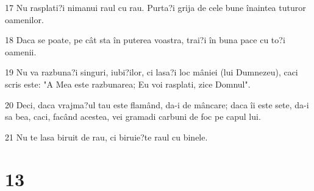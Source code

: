 \par 17 Nu rasplati?i nimanui raul cu rau. Purta?i grija de cele bune înaintea tuturor oamenilor.
\par 18 Daca se poate, pe cât sta în puterea voastra, trai?i în buna pace cu to?i oamenii.
\par 19 Nu va razbuna?i singuri, iubi?ilor, ci lasa?i loc mâniei (lui Dumnezeu), caci scris este: "A Mea este razbunarea; Eu voi rasplati, zice Domnul".
\par 20 Deci, daca vrajma?ul tau este flamând, da-i de mâncare; daca îi este sete, da-i sa bea, caci, facând acestea, vei gramadi carbuni de foc pe capul lui.
\par 21 Nu te lasa biruit de rau, ci biruie?te raul cu binele.

\chapter{13}

